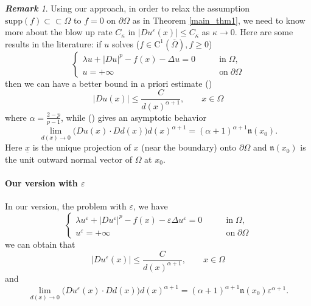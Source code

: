 \documentclass[12pt,reqno]{amsart}
\numberwithin{figure}{section}
\theoremstyle{plain}
\theoremstyle{remark}
\newtheorem{rem}{\bf{Remark}}
\numberwithin{equation}{section}
\begin{document}
\begin{rem} Using our approach, in order to relax the assumption $\mathrm{supp}(f)\subset\subset\Omega$ to $f = 0$ on $\partial\Omega$ as in Theorem \ref{main_thm1}, we need to know more about the blow up rate $C_\kappa$ in $|Du^\varepsilon(x)|\leq C_\kappa$ as $\kappa\to 0$. Here are some results in the literature: if $u$ solves ($f\in \mathrm{C}^1(\overline{\Omega}), f\geq 0$)
\begin{equation*}
\begin{cases}
    \lambda u + |Du|^p - f(x) - \Delta u = 0&\qquad\text{in}\;\Omega,\\
    u = +\infty&\qquad\text{on}\;\partial\Omega
\end{cases}
\end{equation*}
then we can have a better bound in a priori estimate (\cite{lions_quelques_1985}) 
\begin{equation*}
    |Du(x)| \leq \frac{C}{d(x)^{\alpha+1}}, \qquad x\in \Omega
\end{equation*}
where $\alpha = \frac{2-p}{p-1}$, while (\cite{alessio_asymptotic_2006}) gives an asymptotic behavior
\begin{equation*}
    \lim_{d(x)\to 0} \Big(Du(x)\cdot Dd(x)\Big)d(x)^{\alpha+1} = (\alpha+1)^{\alpha+1}\mathfrak{n}(x_0).
\end{equation*}
Here $\underline{x}$ is the unique projection of $x$ (near the boundary) onto $\partial\Omega$ and $\mathfrak{n}(x_0)$ is the unit outward normal vector of $\Omega$ at $x_0$. 
\paragraph{\textbf{Our version with $\varepsilon$}}
In our version, the problem with $\varepsilon$, we have 
\begin{equation*}
\begin{cases}
    \lambda u^\varepsilon + |Du^\varepsilon|^p - f(x) - \varepsilon\Delta u^\varepsilon = 0&\qquad\text{in}\;\Omega,\\
    u^\varepsilon = +\infty&\qquad\text{on}\;\partial\Omega
\end{cases}
\end{equation*}
we can obtain that
\begin{equation}\label{eq:yy}
    |Du^\varepsilon(x)| \leq \frac{C}{d(x)^{\alpha+1}}, \qquad x\in \Omega
\end{equation}
and 
\begin{equation}\label{eq:xx}
    \lim_{d(x)\to 0} \Big(Du^\varepsilon(x)\cdot Dd(x)\Big)d(x)^{\alpha+1} = (\alpha+1)^{\alpha+1}\mathfrak{n}(x_0)\varepsilon^{\alpha+1}.
\end{equation}


\end{rem}
\end{document}
